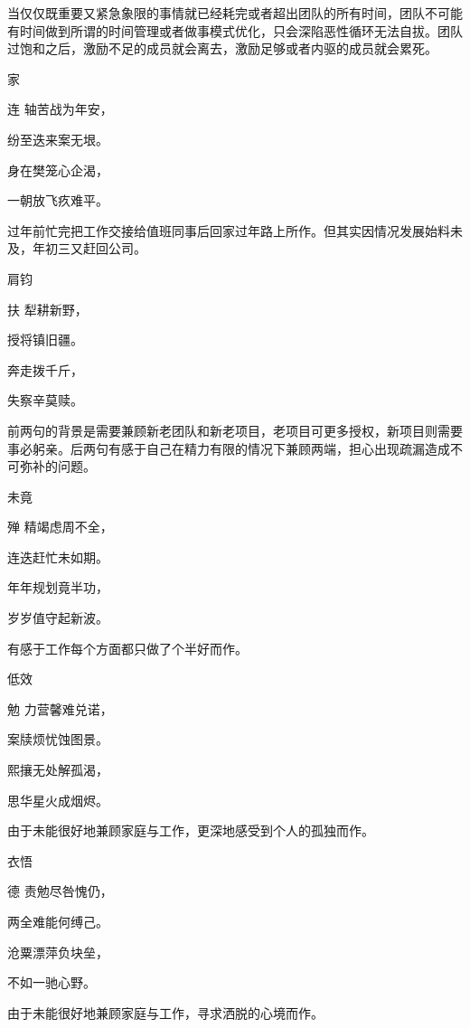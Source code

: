 \documentclass{article}
\newenvironment{poem}[3]{
\begin{minipage}{\textwidth}
\begin{pinyinscope}\begin{center}\Large\linespread{1.4}\selectfont #2\end{center}\end{pinyinscope}
\begin{pinyinscope}
	\begin{center}
	\Large\linespread{1.4}\rmfamily\selectfont #3
}{\end{center}
\end{pinyinscope}
\end{minipage}
}
\begin{document}
当仅仅既重要又紧急象限的事情就已经耗完或者超出团队的所有时间，团队不可能有时间做到所谓的时间管理或者做事模式优化，只会深陷恶性循环无法自拔。团队过饱和之后，激励不足的成员就会离去，激励足够或者内驱的成员就会累死。

\begin{poem}{}{{\xpinyin{还}{huan2}}家}
连轴苦战为年安，

纷至迭来案无垠。

身在樊笼心企渴，

一朝放飞疚难平。
\end{poem}

过年前忙完把工作交接给值班同事后回家过年路上所作。但其实因情况发展始料未及，年初三又赶回公司。

\begin{poem}{}{肩钧}
扶犁耕新野，

授将镇旧疆。

奔走拨千斤，

失察辛莫赎。
\end{poem}

前两句的背景是需要兼顾新老团队和新老项目，老项目可更多授权，新项目则需要事必躬亲。后两句有感于自己在精力有限的情况下兼顾两端，担心出现疏漏造成不可弥补的问题。

\begin{poem}{}{未竟}
殚精竭虑周不全，

连迭赶忙未如期。

年年规划竟半功，

岁岁值守起新波。
\end{poem}

有感于工作每个方面都只做了个半好而作。

\begin{poem}{}{低效}
勉力营馨难兑诺，

案牍烦忧蚀图景。

熙攘无处解孤渴，

思华星火成烟烬。
\end{poem}

由于未能很好地兼顾家庭与工作，更深地感受到个人的孤独而作。

\begin{poem}{}{衣悟}
德责勉尽咎愧仍，

两全难能何缚己。

沧粟漂萍负块垒，

不如一{}驰心野。
\end{poem}

由于未能很好地兼顾家庭与工作，寻求洒脱的心境而作。
\end{document}
